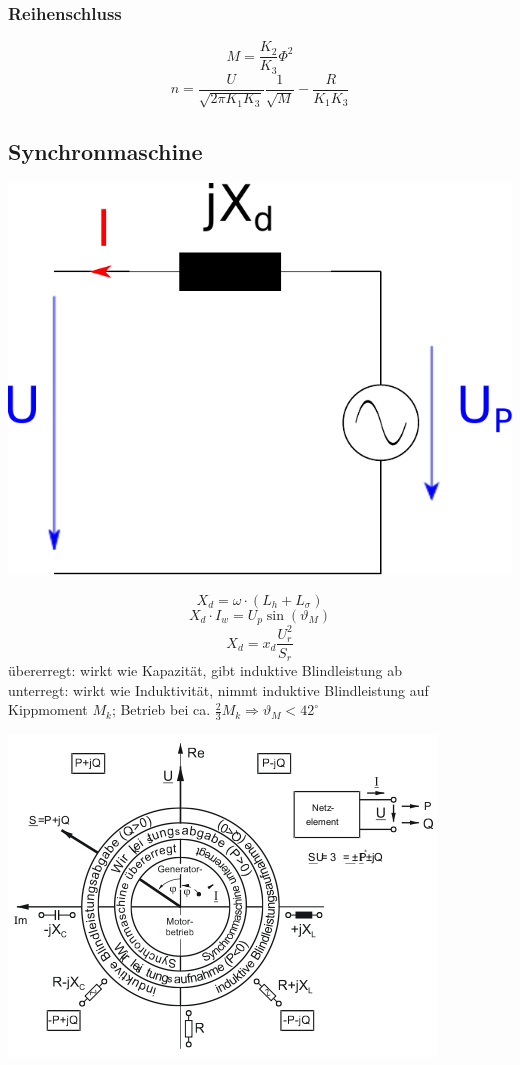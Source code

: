 \documentclass[9pt,a4paper]{scrartcl}
\begin{document}
\begin{multicols}{3}
		\subsubsection{Reihenschluss}
		\[M = \frac{K_2}{K_3} \Phi^2\]
		\[n = \frac{U}{\sqrt{2 \pi K_1 K_3}} \frac{1}{\sqrt{M}} - \frac{R}{K_1 K_3}\]
		
		
		\subsection{Synchronmaschine}		
		\begin{center}
		\includegraphics[scale=.4]{./img/ersatzschaltbild_synchronmaschine.pdf}
		\end{center}		
		\[X_d = \omega \cdot (L_h + L_\sigma)\]
		\[X_d \cdot I_w = U_p \sin(\vartheta_M)\]
		\[X_d = x_d \frac{U_r^2}{S_r}\]		
		übererregt: wirkt wie Kapazität, gibt induktive Blindleistung ab \\
		unterregt: wirkt wie Induktivität, nimmt induktive Blindleistung auf \\		
		Kippmoment $M_k$; Betrieb bei ca. $\frac{2}{3} M_k \Rightarrow \vartheta_M < 42^\circ$\\		
		\begin{center}
		\includegraphics[scale=.75]{./img/synchronmaschine_betriebsbereiche.jpg}
		\end{center}
		

\end{multicols}
\end{document}
